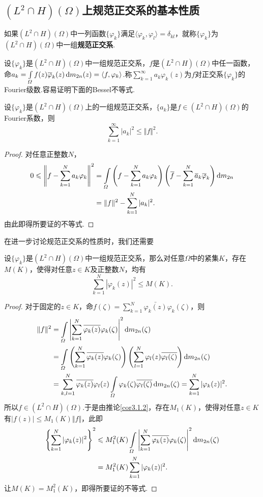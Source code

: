 \subsection{$(L^2\cap H)(\Omega)$上规范正交系的基本性质}
\begin{definition}\label{def3.1.4}
	如果$(L^2\cap H)(\Omega)$中一列函数$\{\varphi_k\}$满足$\langle\varphi_k,\varphi_l\rangle=\delta_{kl}$，就称$\{\varphi_k\}$为$(L^2\cap H)(\Omega)$中一组\textbf{规范正交系}.
\end{definition}
设$\{\varphi_k\}$是$(L^2\cap H)(\Omega)$中一组规范正交系，$f$是$(L^2\cap H)(\Omega)$中任一函数，命$a_k=\int\limits_\varOmega f(z){}\mkern1mu\overline{\mkern-1mu\varphi}_k(z)\mathop{}\!\mathrm{d} m_{2n}(z)=\langle f,\varphi_k\rangle$.称$\sum\limits_{k=1}^\infty a_k\varphi_k(z)$为$f$对正交系$\{\varphi_k\}$的Fourier级数.容易证明下面的Bessel不等式.
\begin{prop}\label{prop3.1.5}
	设$\{\varphi_k\}$是$(L^2\cap H)(\Omega)$上的一组规范正交系，$\{a_k\}$是$f\in(L^2\cap H)(\Omega)$的Fourier系数，则
	\[\sum_{k=1}^{\infty}|a_k|^2\le\Vert f\Vert^2.\]
\end{prop}
\begin{proof}
	对任意正整数$N$，
	\begin{align*}
		0\leqslant\left\Vert f-\sum_{k=1}^{N}a_k\varphi_k\right\Vert^2
		&=\int\limits_\varOmega\left(f-\sum_{k=1}^{N}a_k\varphi_k\right)\left({}\mkern1mu\overline{\mkern-1muf}-\sum_{k=1}^{N}{}\mkern1mu\overline{\mkern-1mua}_k{}\mkern1mu\overline{\mkern-1mu\varphi}_k\right)\mathop{}\!\mathrm{d} m_{2n}\\
		&=\Vert f\Vert^2-\sum_{k=1}^{N}|a_k|^2.
	\end{align*}
由此即得所要证的不等式.
\end{proof}
在进一步讨论规范正交系的性质时，我们还需要
\begin{lemma}\label{lem3.1.6}
	设$\{\varphi_k\}$是$(L^2\cap H)(\Omega)$中一组规范正交系，那么对任意$\Omega$中的紧集$K$，存在$M(K)$，使得对任意$z\in K$及正整数$N$，均有
	\[\sum_{k=1}^{N}|\varphi_k(z)|^2\le M(K).\]
\end{lemma}
\begin{proof}
	对于固定的$z\in K$，命$f(\zeta)=\sum\limits_{k=1}^N\bar{\varphi_k(z)}\varphi_k(\zeta)$，则
	\begin{align*}
		\Vert f\Vert^2
		&=\int\limits_\varOmega \left|\sum_{k=1}^{N}{}\mkern1mu\overline{\mkern-1mu\varphi_k(z)}\varphi_k(\zeta)\right|^2\mathop{}\!\mathrm{d} m_{2n}(\zeta)\\
		&=\int\limits_\varOmega\left(\sum_{k=1}^{N}{}\mkern1mu\overline{\mkern-1mu\varphi_k(z)}\varphi_k(\zeta)\right)\left(\sum_{l=1}^{N}\varphi_l(z){}\mkern1mu\overline{\mkern-1mu\varphi_l(\zeta)}\right)\mathop{}\!\mathrm{d} m_{2n}(\zeta)\\
		&=\sum_{k,l=1}^{N}{}\mkern1mu\overline{\mkern-1mu\varphi_k(z)}\varphi_l(z)\int\limits_\varOmega\varphi_k(\zeta){}\mkern1mu\overline{\mkern-1mu\varphi_l(\zeta)}\mathop{}\!\mathrm{d} m_{2n}(\zeta)=\sum_{k=1}^{N}|\varphi_k(z)|^2.
	\end{align*}
所以$f\in(L^2\cap H)(\Omega)$.于是由推论\ref{cor3.1.2}，存在$M_1(K)$，使得对任意$z\in K$有$|f(z)|\le M_1(K)\Vert f\Vert$，此即
\begin{align*}
	\left\{\sum_{k=1}^{N}|\varphi_k(z)|^2\right\}^2&\leqslant M_1^2(K)\int\limits_\varOmega\left|\sum_{k=1}^{N}{}\mkern1mu\overline{\mkern-1mu\varphi_k(z)}\varphi_k(\zeta)\right|^2\mathop{}\!\mathrm{d} m_{2n}(\zeta)\\
	&=M_1^2(K)\sum_{k=1}^{N}|\varphi_k(z)|^2.
\end{align*}
让$M(K)=M_1^2(K)$，即得所要证的不等式.
\end{proof}
